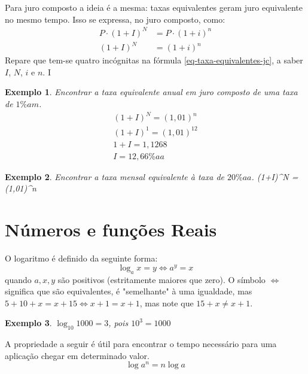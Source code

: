 \documentclass{book}
\theoremstyle{definition}
\theoremstyle{remark}
\theoremstyle{plain}
\theoremstyle{plain}
\theoremstyle{plain}
\theoremstyle{plain}
\newtheorem{example}{Exemplo}
\begin{document}
    Para juro composto a ideia é a mesma: taxas equivalentes geram juro equivalente no mesmo tempo. Isso se expressa,
    no juro composto, como:
    \begin{align}
        P \cdot (1+I)^N &= P \cdot (1+i)^n \\
        (1+I)^N         &= (1+i)^n \label{eq-taxa-equivalentes-jc}
    \end{align}
    Repare que tem-se quatro incógnitas na fórmula \ref{eq-taxa-equivalentes-jc}, a saber $I$, $N$, $i$ e $n$. I 
    \begin{example}
        Encontrar a taxa equivalente anual em juro composto de uma taxa de $1\%am$. \\
        \begin{align}
            (1+I)^N = (1,01)^{n} \\
            (1+I)^1 = (1,01)^{12} \\
            1+I = 1,1268 \\
            I = 12,66\%aa 
        \end{align}
    \end{example}
    \begin{example}
        Encontrar a taxa mensal equivalente à taxa de $20\%aa$.
            (1+I)^N = (1,01)^{n} \\
    \end{example}

    \appendix
    \section{Números e funções Reais}
    O logaritmo é definido da seguinte forma: \\
    $$\log_a x = y \iff a^y = x$$
    quando $a, x, y$ são positivos (estritamente maiores que zero). O símbolo $\iff$ significa 
    que são equivalentes, é "semelhante" à uma igualdade, mas \\
    $5 + 10 + x = x + 15 \iff x+1 = x+1$, mas note que $15+x \neq x+1$.
    \begin{example}
        $\log_{10} 1000 = 3$, pois $10^3 = 1000$
    \end{example}
    A propriedade a seguir é útil para encontrar o tempo necessário para uma aplicação chegar em determinado valor.
    $$\log a^n = n \log a$$
\end{document}
